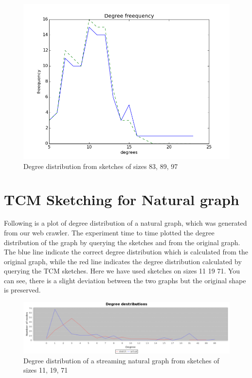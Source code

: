 \documentclass[12pt]{report}
\numberwithin{figure}{section}
\numberwithin{table}{section}
\begin{document}
\begin{figure}[H]
\centering
\includegraphics[scale=0.6]{images/dd3}
\caption{Degree distribution from sketches of sizes 83, 89, 97}
\end{figure}

\section{TCM Sketching for Natural graph}
Following is a plot of degree distribution of a natural graph, which was generated from our web crawler. The experiment time to time plotted the degree distribution of the graph by querying the sketches and from the original graph. The blue line indicate the correct degree distribution which is calculated from the original graph, while the red line indicates the degree distribution calculated by querying the TCM sketches. Here we have used sketches on sizes 11 19 71. You can see, there is a slight deviation between the two graphs but the original shape is preserved.

\begin{figure}[H]
\centering
\includegraphics[scale=0.3]{images/ddn}
\caption{Degree distribution of a streaming natural graph from sketches of sizes 11, 19, 71}
\end{figure}
\end{document}
